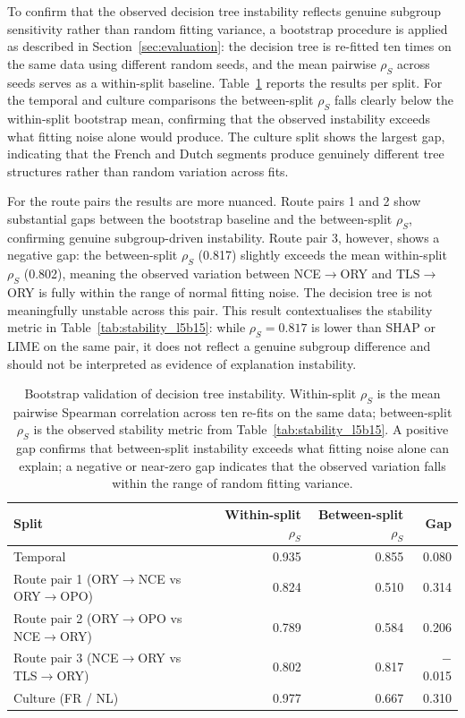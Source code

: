 \documentclass[oneside]{memoir} %
\begin{document}
To confirm that the observed decision tree instability reflects genuine subgroup sensitivity rather than random fitting variance, a bootstrap procedure is applied as described in Section~\ref{sec:evaluation}: the decision tree is re-fitted ten times on the same data using different random seeds, and the mean pairwise $\rho_S$ across seeds serves as a within-split baseline. Table~\ref{tab:bootstrap_dt_main} reports the results per split. For the temporal and culture comparisons the between-split $\rho_S$ falls clearly below the within-split bootstrap mean, confirming that the observed instability exceeds what fitting noise alone would produce. The culture split shows the largest gap, indicating that the French and Dutch segments produce genuinely different tree structures rather than random variation across fits.

For the route pairs the results are more nuanced. Route pairs 1 and 2 show substantial gaps between the bootstrap baseline and the between-split $\rho_S$, confirming genuine subgroup-driven instability. Route pair 3, however, shows a negative gap: the between-split $\rho_S$ (0.817) slightly exceeds the mean within-split $\rho_S$ (0.802), meaning the observed variation between NCE$\to$ORY and TLS$\to$ORY is fully within the range of normal fitting noise. The decision tree is not meaningfully unstable across this pair. This result contextualises the stability metric in Table~\ref{tab:stability_l5b15}: while $\rho_S = 0.817$ is lower than SHAP or LIME on the same pair, it does not reflect a genuine subgroup difference and should not be interpreted as evidence of explanation instability.

\begin{table}[ht]
\caption{Bootstrap validation of decision tree instability. Within-split $\rho_S$ is the mean pairwise Spearman correlation across ten re-fits on the same data; between-split $\rho_S$ is the observed stability metric from Table~\ref{tab:stability_l5b15}. A positive gap confirms that between-split instability exceeds what fitting noise alone can explain; a negative or near-zero gap indicates that the observed variation falls within the range of random fitting variance.}
\label{tab:bootstrap_dt_main}
\centering
\begin{tabular}{lrrr}
\toprule
Split & Within-split $\rho_S$ & Between-split $\rho_S$ & Gap \\
\midrule
Temporal& 0.935 & 0.855 & 0.080 \\
Route pair 1 (ORY$\to$NCE vs ORY$\to$OPO) & 0.824 & 0.510 & 0.314 \\
Route pair 2 (ORY$\to$OPO vs NCE$\to$ORY) & 0.789 & 0.584 & 0.206 \\
Route pair 3 (NCE$\to$ORY vs TLS$\to$ORY) & 0.802 & 0.817 & $-$0.015 \\
Culture (FR / NL) & 0.977 & 0.667 & 0.310 \\
\bottomrule
\end{tabular}
\end{table}
\end{document}
